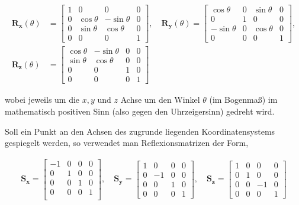 \begin{align*}
    \boldsymbol{R_x}(\theta) &= 
    \begin{bmatrix}
        1 & 0 & 0 & 0 \\
        0 & \cos \theta & - \sin \theta & 0 \\
        0 & \sin \theta & \cos \theta & 0 \\
        0 & 0 & 0 & 1
    \end{bmatrix}, \quad
    \boldsymbol{R_y}(\theta) = 
    \begin{bmatrix}
        \cos \theta & 0 & \sin \theta & 0 \\
        0 & 1 & 0 & 0 \\
        - \sin \theta & 0 & \cos \theta & 0 \\
        0 & 0 & 0 & 1
    \end{bmatrix}, \\
    \boldsymbol{R_z}(\theta) &= 
    \begin{bmatrix}
        \cos \theta & - \sin \theta & 0 & 0 \\
        \sin \theta & \cos \theta & 0 & 0 \\
        0 & 0 & 1 & 0 \\
        0 & 0 & 0 & 1
    \end{bmatrix}
\end{align*}

wobei jeweils um die \( x, y \text{ und } z \) Achse um den Winkel \( \theta \) (im Bogenmaß) im mathematisch positiven Sinn (also gegen den Uhrzeigersinn) gedreht wird.

Soll ein Punkt an den Achsen des zugrunde liegenden Koordinatensystems gespiegelt werden, so verwendet man Reflexionsmatrizen der Form,

\begin{align*}
    \boldsymbol{S_x} = 
    \begin{bmatrix}
        -1 & 0 & 0 & 0 \\
        0 & 1 & 0 & 0 \\
        0 & 0 & 1 & 0 \\
        0 & 0 & 0 & 1 \\        
    \end{bmatrix}, \quad
    \boldsymbol{S_y} = 
    \begin{bmatrix}
        1 & 0 & 0 & 0 \\
        0 & -1 & 0 & 0 \\
        0 & 0 & 1 & 0 \\
        0 & 0 & 0 & 1
    \end{bmatrix}, \quad
    \boldsymbol{S_z} =
    \begin{bmatrix}
        1 & 0 & 0 & 0 \\
        0 & 1 & 0 & 0 \\
        0 & 0 & -1 & 0 \\
        0 & 0 & 0 & 1
    \end{bmatrix}
\end{align*}


